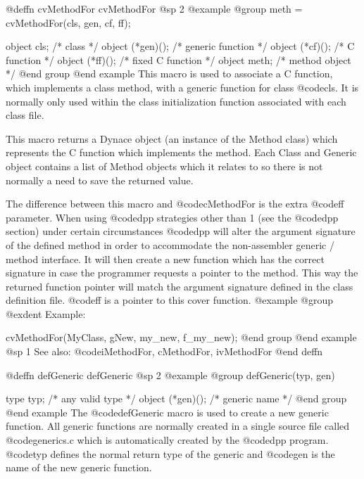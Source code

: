 {{{{@deffn {cvMethodFor} cvMethodFor
@sp 2
@example
@group
meth = cvMethodFor(cls, gen, cf, ff);

object  cls;            /*  class               */
object  (*gen)();       /*  generic function    */
object  (*cf)();        /*  C function          */
object  (*ff)();        /*  fixed C function    */
object  meth;           /*  method object       */
@end group
@end example
This macro is used to associate a C function, which implements a
class method, with a generic function for class @code{cls}.  It is
normally only used within the class initialization function associated
with each class file.

This macro returns a Dynace object (an instance of the Method class) which
represents the C function which implements the method.  Each Class 
and Generic object contains a list of Method objects which it relates
to so there is not normally a need to save the returned value.

The difference between this macro and @code{cMethodFor} is the extra @code{ff}
parameter.  When using @code{dpp} strategies other than 1 (see the @code{dpp}
section) under certain circumstances @code{dpp} will alter the argument
signature of the defined method in order to accommodate the non-assembler
generic / method interface.  It will then create a new function which has
the correct signature in case the programmer requests a pointer to the
method.  This way the returned function pointer will match the argument
signature defined in the class definition file.  @code{ff} is a pointer
to this cover function.
@example
@group
@exdent Example:

cvMethodFor(MyClass, gNew, my_new, f_my_new);
@end group
@end example
@sp 1
See also:  @code{iMethodFor, cMethodFor, ivMethodFor}
@end deffn

















@deffn {defGeneric} defGeneric
@sp 2
@example
@group
defGeneric(typ, gen)

type    typ;       /*  any valid type  */
object  (*gen)();  /*  generic name    */
@end group
@end example
The @code{defGeneric} macro is used to create a new generic function.
All generic functions are normally created in a single source file
called @code{generics.c} which is automatically created by the
@code{dpp} program.  @code{typ} defines the normal return type
of the generic and @code{gen} is the name of the new generic function.

}}}}
